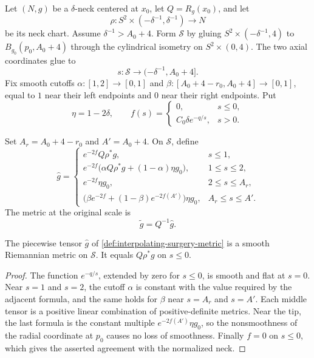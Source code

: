 \begin{definition}
\label{def:local-neck-surgery-data}
\notready
Let $(N,g)$ be a $\delta$-neck centered at $x_0$, let
$Q=R_g(x_0)$, and let
\[
 \rho\colon S^2\times(-\delta^{-1},\delta^{-1})\longrightarrow N
\]
be its neck chart.  Assume $\delta^{-1}>A_0+4$.  Form $\mathcal S$ by
gluing $S^2\times(-\delta^{-1},4)$ to
$B_{g_0}(p_0,A_0+4)$ through the cylindrical isometry on
$S^2\times(0,4)$.  The two axial coordinates glue to
\[
 s\colon\mathcal S\longrightarrow(-\delta^{-1},A_0+4].
\]
Fix smooth cutoffs $\alpha\colon[1,2]\to[0,1]$ and
$\beta\colon[A_0+4-r_0,A_0+4]\to[0,1]$, equal to $1$ near their left
endpoints and $0$ near their right endpoints.  Put
\[
 \eta=1-2\delta,
 \qquad
 f(s)=\begin{cases}
 0,&s\le0,\\
 C_0\delta e^{-q/s},&s>0.
 \end{cases}
\]
\end{definition}

\begin{definition}
\label{def:interpolating-surgery-metric}
\notready
Set $A_r=A_0+4-r_0$ and $A'=A_0+4$.  On $\mathcal S$, define
\[
\widehat g=
\begin{cases}
 e^{-2f}Q\rho^*g,&s\le1,\\
 e^{-2f}\bigl(\alpha Q\rho^*g+(1-\alpha)\eta g_0\bigr),
     &1\le s\le2,\\
 e^{-2f}\eta g_0,&2\le s\le A_r,\\
 \bigl(\beta e^{-2f}+(1-\beta)e^{-2f(A')}\bigr)\eta g_0,
     &A_r\le s\le A'.
\end{cases}
\]
The metric at the original scale is
\[
 \widetilde g=Q^{-1}\widehat g.
\]
\end{definition}

\begin{lemma}
\label{lem:interpolating-surgery-metric-smooth}
\notready
The piecewise tensor $\widehat g$ of
\ref{def:interpolating-surgery-metric} is a smooth Riemannian metric on
$\mathcal S$.  It equals $Q\rho^*g$ on $s\le0$.
\end{lemma}

\begin{proof}
The function $e^{-q/s}$, extended by zero for $s\le0$, is smooth and flat
at $s=0$.  Near $s=1$ and $s=2$, the cutoff $\alpha$ is constant with the
value required by the adjacent formula, and the same holds for $\beta$
near $s=A_r$ and $s=A'$.  Each middle tensor is a positive linear
combination of positive-definite metrics.  Near the tip, the last formula
is the constant multiple $e^{-2f(A')}\eta g_0$, so the nonsmoothness of the
radial coordinate at $p_0$ causes no loss of smoothness.  Finally $f=0$ on
$s\le0$, which gives the asserted agreement with the normalized neck.
\end{proof}

